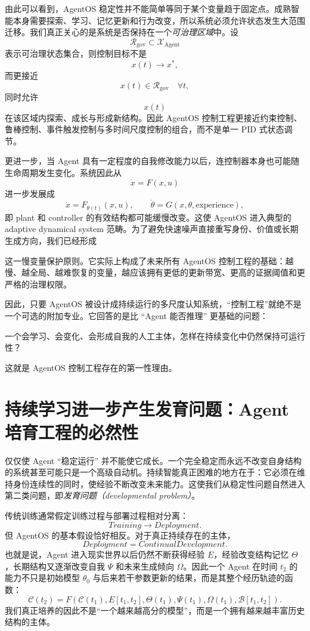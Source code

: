 由此可以看到，AgentOS 稳定性并不能简单等同于某个变量趋于固定点。成熟智能本身需要探索、学习、记忆更新和行为改变，所以系统必须允许状态发生大范围迁移。我们真正关心的是系统是否保持在一个\emph{可治理区域}中。设
\[
\mathcal R_{\mathrm{gov}}
\subset
\mathcal X_{\mathrm{Agent}}
\]
表示可治理状态集合，则控制目标不是
\[
x(t)\rightarrow x^{*},
\]
而更接近
\[
\boxed{
x(t)\in\mathcal R_{\mathrm{gov}}
\quad
\forall t,
}
\]
同时允许
\[
x(t)
\]
在该区域内探索、成长与形成新结构。因此 AgentOS 控制工程更接近约束控制、鲁棒控制、事件触发控制与多时间尺度控制的组合，而不是单一 PID 式状态调节。

更进一步，当 Agent 具有一定程度的自我修改能力以后，连控制器本身也可能随生命周期发生变化。系统因此从
\[
\dot{x}=F(x,u)
\]
进一步发展成
\[
\dot{x}
=
F_{\theta(t)}
(x,u),
\qquad
\dot{\theta}
=
G(x,\theta,\text{experience}),
\]
即 plant 和 controller 的有效结构都可能缓慢改变。这使 AgentOS 进入典型的 adaptive dynamical system 范畴。为了避免快速噪声直接重写身份、价值或长期生成方向，我们已经形成
\begin{statementbox}
\centering
{}
\end{statementbox}
这一慢变量保护原则。它实际上构成了未来所有 AgentOS 控制工程的基础：越慢、越全局、越难恢复的变量，越应该拥有更低的更新带宽、更高的证据阈值和更严格的治理权限。

因此，只要 AgentOS 被设计成持续运行的多尺度认知系统，“控制工程”就绝不是一个可选的附加专业。它回答的是比 ``Agent 能否推理'' 更基础的问题：

\begin{statementbox}
一个会学习、会变化、会形成自我的人工主体，怎样在持续变化中仍然保持可运行性？
\end{statementbox}
这就是 AgentOS 控制工程存在的第一性理由。

\section{持续学习进一步产生发育问题：Agent 培育工程的必然性}

仅仅使 Agent ``稳定运行'' 并不能使它成长。一个完全稳定而永远不改变自身结构的系统甚至可能只是一个高级自动机。持续智能真正困难的地方在于：它必须在维持身份连续性的同时，使经验不断改变未来能力。这使我们从稳定性问题自然进入第二类问题，即\emph{发育问题（developmental problem）}。

传统训练通常假定训练过程与部署过程相对分离：
\[
Training
\rightarrow
Deployment.
\]
但 AgentOS 的基本假设恰好相反。对于真正持续存在的主体，
\[
\boxed{
Deployment
=
ContinualDevelopment.
}
\]
也就是说，Agent 进入现实世界以后仍然不断获得经验 $E$，经验改变结构记忆 $\Theta$，长期结构又逐渐改变自我 $\Psi$ 和未来生成倾向 $\Omega$。因此一个 Agent 在时间 $t_2$ 的能力不只是初始模型 $\theta_0$ 与后来若干参数更新的结果，而是其整个经历轨迹的函数：
\[
\mathcal C(t_2)
=
F
\left(
\mathcal C(t_1),
E[t_1,t_2],
\Theta(t_1),
\Psi(t_1),
\Omega(t_1),
\mathcal B[t_1,t_2]
\right).
\]
我们真正培养的因此不是“一个越来越高分的模型”，而是一个拥有越来越丰富历史结构的主体。

